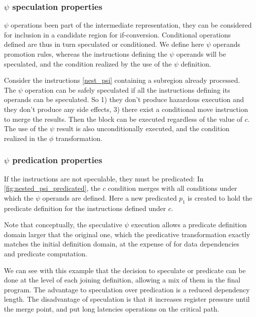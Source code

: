 \subsubsection{$\psi$ speculation properties}

$\psi$ operations been part of the intermediate representation, they can be considered for inclusion in a candidate region for if-conversion. Conditional operations defined are thus in turn speculated or conditioned. We define here $\psi$ operands promotion rules, whereas the instructions defining the $\psi$ operands will be speculated, and the condition realized by the use of the $\psi$ definition.

Consider the instructions \ref{nest_psi} containing a subregion already processed. The $\psi$ operation can be safely speculated if all the instructions defining its operands can be speculated. So 1) they don't produce hazardous execution and they don't produce any side effects, 3) there exist a conditional move instruction to merge the results. Then the block can be executed regardless of the value of $c$. The use of the $\psi$ result is also unconditionally executed, and the condition realized in the $\phi$ transformation.

\subsubsection{$\psi$ predication properties}

If the instructions are not speculable, they must be predicated:
In \ref{fig:nested_psi_predicated}, the $c$ condition merges with all conditions under which the $\psi$ operands are defined. Here a new predicated $p_1$ is created to hold the predicate definition for the instructions defined under $c$. 

Note that conceptually, the speculative $\psi$ execution allows a predicate definition domain larger that the original one, which the predicative transformation exactly matches the initial definition domain, at the expense of for data dependencies and predicate computation.

We can see with this example that the decision to speculate or predicate can be done at the level of each joining definition, allowing a mix of them in the final program. The advantage to speculation over predication is a reduced dependency length. The disadvantage of speculation is that it increases register pressure until the merge point, and put long latencies operations on the critical path.
 
